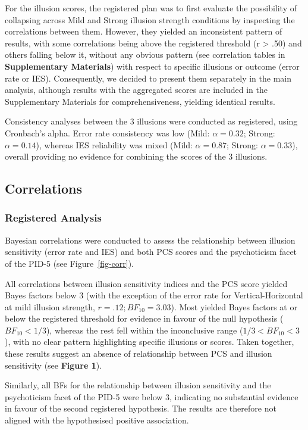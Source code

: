 \documentclass[
  man,
  floatsintext,
  longtable,
  nolmodern,
  notxfonts,
  notimes,
  colorlinks=true,linkcolor=blue,citecolor=blue,urlcolor=blue]{apa7}
\begin{document}
For the illusion scores, the registered plan was to first evaluate the
possibility of collapsing across Mild and Strong illusion strength
conditions by inspecting the correlations between them. However, they
yielded an inconsistent pattern of results, with some correlations being
above the registered threshold (r \textgreater{} .50) and others falling
below it, without any obvious pattern (see correlation tables in
\textbf{Supplementary Materials}) with respect to specific illusions or
outcome (error rate or IES). Consequently, we decided to present them
separately in the main analysis, although results with the aggregated
scores are included in the Supplementary Materials for
comprehensiveness, yielding identical results.

Consistency analyses between the 3 illusions were conducted as
registered, using Cronbach's alpha. Error rate consistency was low
(Mild: \(\alpha = 0.32\); Strong: \(\alpha = 0.14\)), whereas IES
reliability was mixed (Mild: \(\alpha = 0.87\); Strong:
\(\alpha = 0.33\)), overall providing no evidence for combining the
scores of the 3 illusions.

\subsection{Correlations}\label{correlations}

\subsubsection{Registered Analysis}\label{registered-analysis}

Bayesian correlations were conducted to assess the relationship between
illusion sensitivity (error rate and IES) and both PCS scores and the
psychoticism facet of the PID-5 (see Figure~\ref{fig-corr}).

All correlations between illusion sensitivity indices and the PCS score
yielded Bayes factors below 3 (with the exception of the error rate for
Vertical-Horizontal at mild illusion strength,
\(r = .12; BF_{10} = 3.03\)). Most yielded Bayes factors at or below the
registered threshold for evidence in favour of the null hypothesis
(\(BF_{10} < 1/3\)), whereas the rest fell within the inconclusive range
(\(1/3 < BF_{10} < 3\)), with no clear pattern highlighting specific
illusions or scores. Taken together, these results suggest an absence of
relationship between PCS and illusion sensitivity (see \textbf{Figure
1}).

Similarly, all BFs for the relationship between illusion sensitivity and
the psychoticism facet of the PID-5 were below 3, indicating no
substantial evidence in favour of the second registered hypothesis. The
results are therefore not aligned with the hypothesised positive
association.
\end{document}
